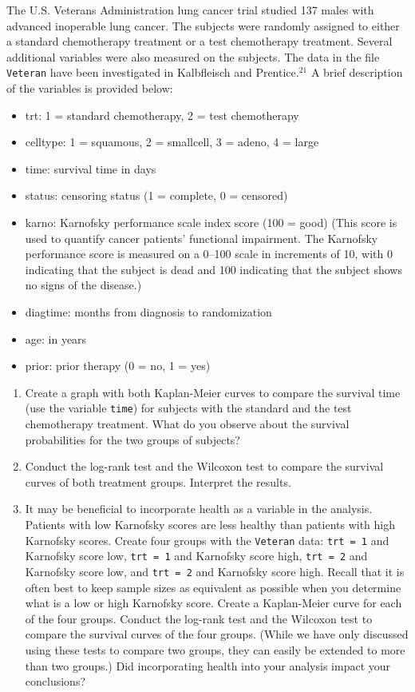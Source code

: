 \documentclass[
]{book}
\begin{document}
\begin{enumerate}
The U.S. Veterans Administration lung cancer trial studied 137 males with advanced inoperable lung cancer. The subjects were randomly assigned to either a standard chemotherapy treatment or a test chemotherapy treatment. Several additional variables were also measured on the subjects. The data in the file \texttt{Veteran} have been investigated in Kalbfleisch and Prentice.$^{21}$ A brief description of the variables is provided below:
\begin{itemize}
  \item trt: 1 = standard chemotherapy, 2 = test chemotherapy
  \item celltype: 1 = squamous, 2 = smallcell, 3 = adeno, 4 = large
  \item time: survival time in days
  \item status: censoring status (1 = complete, 0 = censored)
  \item karno: Karnofsky performance scale index score (100 = good) (This score is used to quantify cancer patients’ functional impairment. The Karnofsky performance score is measured on a 0–100 scale in increments of 10, with 0 indicating that the subject is dead and 100 indicating that the subject shows no signs of the disease.)
  \item diagtime: months from diagnosis to randomization
  \item age: in years
  \item prior: prior therapy (0 = no, 1 = yes)
\end{itemize}
  \begin{enumerate}
    \item Create a graph with both Kaplan-Meier curves to compare the survival time (use the variable \texttt{time}) for subjects with the standard and the test chemotherapy treatment. What do you observe about the survival probabilities for the two groups of subjects?
    \item Conduct the log-rank test and the Wilcoxon test to compare the survival curves of both treatment groups. Interpret the results.
    \item It may be beneficial to incorporate health as a variable in the analysis. Patients with low Karnofsky scores are less healthy than patients with high Karnofsky scores. Create four groups with the \texttt{Veteran} data: \texttt{trt = 1} and Karnofsky score low, \texttt{trt = 1} and Karnofsky score high, \texttt{trt = 2} and Karnofsky score low, and \texttt{trt = 2} and Karnofsky score high. Recall that it is often best to keep sample sizes as equivalent as possible when you determine what is a low or high Karnofsky score. Create a Kaplan-Meier curve for each of the four groups. Conduct the log-rank test and the Wilcoxon test to compare the survival curves of the four groups. (While we have only discussed using these tests to compare two groups, they can easily be extended to more than two groups.) Did incorporating health into your analysis impact your conclusions?
  \end{enumerate}


\end{enumerate}
\end{document}
